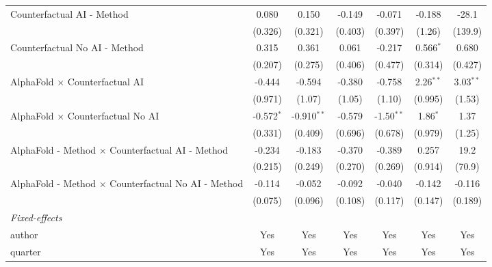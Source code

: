 \begin{tabular}{lcccccc}
   Counterfactual AI - Method                                 & 0.080         & 0.150         & -0.149       & -0.071       & -0.188      & -28.1\\   
                                                              & (0.326)       & (0.321)       & (0.403)      & (0.397)      & (1.26)      & (139.9)\\   
   Counterfactual No AI - Method                              & 0.315         & 0.361         & 0.061        & -0.217       & 0.566$^{*}$ & 0.680\\   
                                                              & (0.207)       & (0.275)       & (0.406)      & (0.477)      & (0.314)     & (0.427)\\   
   AlphaFold $\times$ Counterfactual AI                       & -0.444        & -0.594        & -0.380       & -0.758       & 2.26$^{**}$ & 3.03$^{**}$\\   
                                                              & (0.971)       & (1.07)        & (1.05)       & (1.10)       & (0.995)     & (1.53)\\   
   AlphaFold $\times$ Counterfactual No AI                    & -0.572$^{*}$  & -0.910$^{**}$ & -0.579       & -1.50$^{**}$ & 1.86$^{*}$  & 1.37\\   
                                                              & (0.331)       & (0.409)       & (0.696)      & (0.678)      & (0.979)     & (1.25)\\   
   AlphaFold - Method $\times$ Counterfactual AI - Method     & -0.234        & -0.183        & -0.370       & -0.389       & 0.257       & 19.2\\   
                                                              & (0.215)       & (0.249)       & (0.270)      & (0.269)      & (0.914)     & (70.9)\\   
   AlphaFold - Method $\times$ Counterfactual No AI - Method  & -0.114        & -0.052        & -0.092       & -0.040       & -0.142      & -0.116\\   
                                                              & (0.075)       & (0.096)       & (0.108)      & (0.117)      & (0.147)     & (0.189)\\   
   \midrule
   \emph{Fixed-effects}\\
   author                                                     & Yes           & Yes           & Yes          & Yes          & Yes         & Yes\\  
   quarter                                                    & Yes           & Yes           & Yes          & Yes          & Yes         & Yes\\  

\end{tabular}
